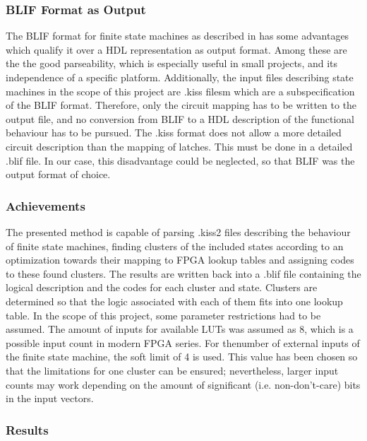 \subsubsection{BLIF Format as Output}
\label{subsubsec:BLIFOutput}

The BLIF format for finite state machines as described in \cite{blif} has some advantages which qualify it over a HDL representation as output format. Among these are the the good parseability, which is especially useful in small projects, and its independence of a specific platform.
Additionally, the input files describing state machines in the scope of this project are .kiss filesm which are a subspecification of the BLIF format. Therefore, only the circuit mapping has to be written to the output file, and no conversion from BLIF to a HDL description of the functional behaviour has to be pursued. The .kiss format does not allow a more detailed circuit description than the mapping of latches. This must be done in a detailed .blif file. In our case, this disadvantage could be neglected, so that BLIF was the output format of choice.

\subsubsection{Achievements}
\label{subsubsec:Achievements}

The presented method is capable of parsing .kiss2 files describing the behaviour of finite state machines, finding clusters of the included states
according to an optimization towards their mapping to FPGA lookup tables and assigning codes to these found clusters. The results are written back into a .blif file containing the logical description and the codes for each cluster and state. Clusters are determined so that the logic associated with each of them fits into one lookup table. In the scope of this project, some parameter restrictions had to be assumed. The amount of inputs for available LUTs was assumed as 8, which is a possible input count in modern FPGA series. For thenumber of external inputs of the finite state machine, the soft limit of 4 is used. This value has been chosen so that the limitations for one cluster can be ensured; nevertheless, larger input counts may work depending on the amount of significant (i.e. non-don't-care) bits in the input vectors.

\subsubsection{Results}
\label{subsubsec:Results}

